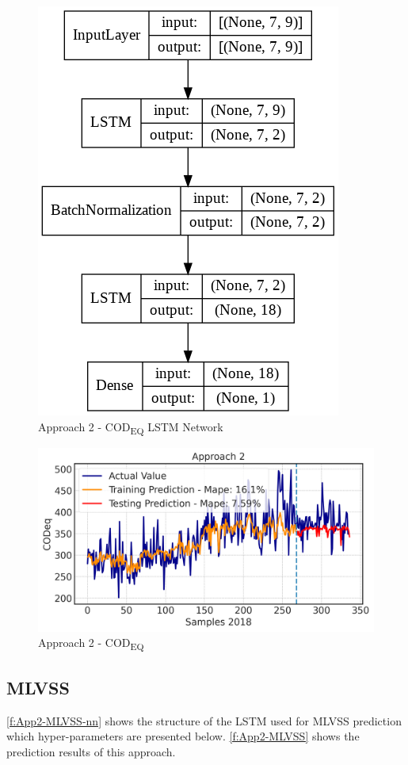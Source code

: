 \begin{figure}[h]
\centering
 \includegraphics[width=0.4\linewidth]{figures/Ch5/App2_CODeq.png}
\caption{Approach 2 - COD\textsubscript{EQ} LSTM Network}
\label{f:App2-codeq-nn}
\end{figure}

\begin{figure}[h]
\centering
\includegraphics[width=\linewidth]{figures/Ch5/CODeq-2.png}
\caption{Approach 2 - COD\textsubscript{EQ}}
\label{f:App2-codeq}
\end{figure}

\subsection{MLVSS}
\autoref{f:App2-MLVSS-nn} shows the structure of the \ac{LSTM} used for \ac{MLVSS} prediction which hyper-parameters are presented below. \autoref{f:App2-MLVSS} shows the prediction results of this approach.

